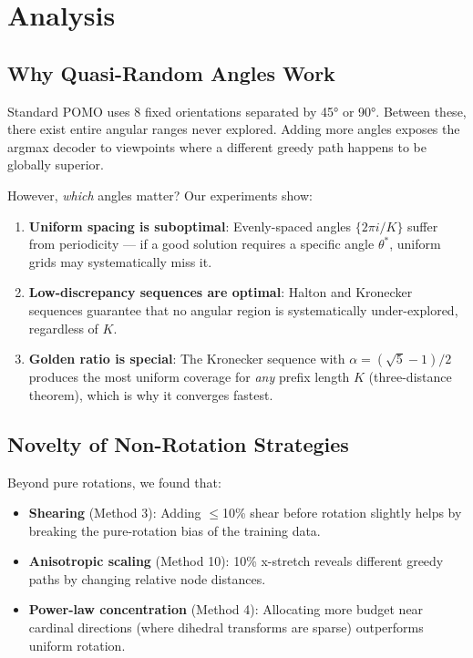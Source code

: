\documentclass[11pt,a4paper]{article}
\begin{document}
\section{Analysis}
\label{sec:analysis}

\subsection{Why Quasi-Random Angles Work}

Standard POMO uses 8 fixed orientations separated by 45° or 90°. Between
these, there exist entire angular ranges never explored. Adding more angles
exposes the argmax decoder to viewpoints where a different greedy path
happens to be globally superior.

However, \emph{which} angles matter? Our experiments show:
\begin{enumerate}
  \item \textbf{Uniform spacing is suboptimal}: Evenly-spaced angles
        $\{2\pi i / K\}$ suffer from periodicity --- if a good solution
        requires a specific angle $\theta^*$, uniform grids may
        systematically miss it.
  \item \textbf{Low-discrepancy sequences are optimal}: Halton and Kronecker
        sequences guarantee that no angular region is systematically
        under-explored, regardless of $K$.
  \item \textbf{Golden ratio is special}: The Kronecker sequence with
        $\alpha = (\sqrt{5}-1)/2$ produces the most uniform coverage for
        \emph{any} prefix length $K$ (three-distance theorem), which is why
        it converges fastest.
\end{enumerate}

\subsection{Novelty of Non-Rotation Strategies}

Beyond pure rotations, we found that:
\begin{itemize}
  \item \textbf{Shearing} (Method 3): Adding $\leq$10\% shear before rotation
        slightly helps by breaking the pure-rotation bias of the training data.
  \item \textbf{Anisotropic scaling} (Method 10): 10\% x-stretch reveals
        different greedy paths by changing relative node distances.
  \item \textbf{Power-law concentration} (Method 4): Allocating more budget
        near cardinal directions (where dihedral transforms are sparse)
        outperforms uniform rotation.
\end{itemize}
\end{document}

